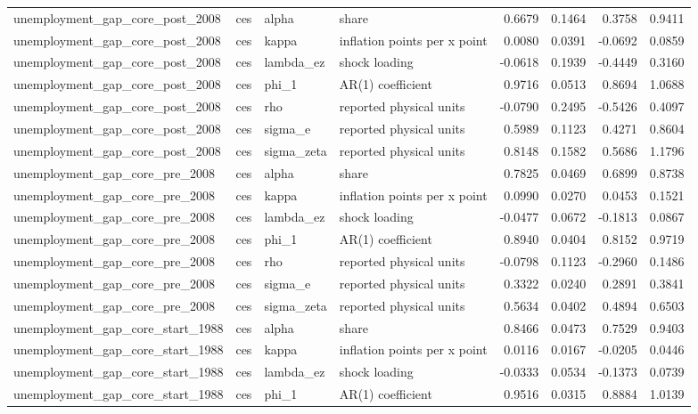 \begin{tabular}{llllrrrr}
unemployment\_gap\_core\_post\_2008 & ces & alpha & share & 0.6679 & 0.1464 & 0.3758 & 0.9411 \\
unemployment\_gap\_core\_post\_2008 & ces & kappa & inflation points per x point & 0.0080 & 0.0391 & -0.0692 & 0.0859 \\
unemployment\_gap\_core\_post\_2008 & ces & lambda\_ez & shock loading & -0.0618 & 0.1939 & -0.4449 & 0.3160 \\
unemployment\_gap\_core\_post\_2008 & ces & phi\_1 & AR(1) coefficient & 0.9716 & 0.0513 & 0.8694 & 1.0688 \\
unemployment\_gap\_core\_post\_2008 & ces & rho & reported physical units & -0.0790 & 0.2495 & -0.5426 & 0.4097 \\
unemployment\_gap\_core\_post\_2008 & ces & sigma\_e & reported physical units & 0.5989 & 0.1123 & 0.4271 & 0.8604 \\
unemployment\_gap\_core\_post\_2008 & ces & sigma\_zeta & reported physical units & 0.8148 & 0.1582 & 0.5686 & 1.1796 \\
unemployment\_gap\_core\_pre\_2008 & ces & alpha & share & 0.7825 & 0.0469 & 0.6899 & 0.8738 \\
unemployment\_gap\_core\_pre\_2008 & ces & kappa & inflation points per x point & 0.0990 & 0.0270 & 0.0453 & 0.1521 \\
unemployment\_gap\_core\_pre\_2008 & ces & lambda\_ez & shock loading & -0.0477 & 0.0672 & -0.1813 & 0.0867 \\
unemployment\_gap\_core\_pre\_2008 & ces & phi\_1 & AR(1) coefficient & 0.8940 & 0.0404 & 0.8152 & 0.9719 \\
unemployment\_gap\_core\_pre\_2008 & ces & rho & reported physical units & -0.0798 & 0.1123 & -0.2960 & 0.1486 \\
unemployment\_gap\_core\_pre\_2008 & ces & sigma\_e & reported physical units & 0.3322 & 0.0240 & 0.2891 & 0.3841 \\
unemployment\_gap\_core\_pre\_2008 & ces & sigma\_zeta & reported physical units & 0.5634 & 0.0402 & 0.4894 & 0.6503 \\
unemployment\_gap\_core\_start\_1988 & ces & alpha & share & 0.8466 & 0.0473 & 0.7529 & 0.9403 \\
unemployment\_gap\_core\_start\_1988 & ces & kappa & inflation points per x point & 0.0116 & 0.0167 & -0.0205 & 0.0446 \\
unemployment\_gap\_core\_start\_1988 & ces & lambda\_ez & shock loading & -0.0333 & 0.0534 & -0.1373 & 0.0739 \\
unemployment\_gap\_core\_start\_1988 & ces & phi\_1 & AR(1) coefficient & 0.9516 & 0.0315 & 0.8884 & 1.0139 \\

\end{tabular}

